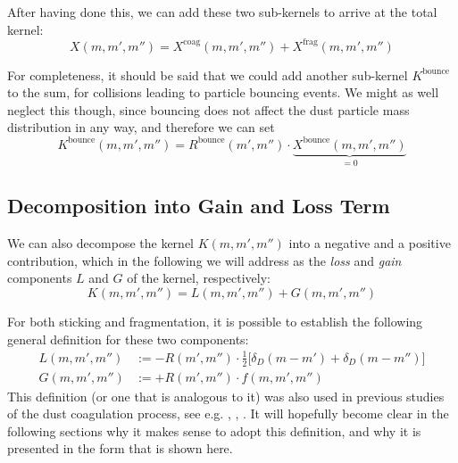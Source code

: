         After having done this, we can add these two sub-kernels to arrive at the total kernel:
        \begin{equation}
            X(m,m',m'') = X^\text{coag}(m,m',m'') + X^\text{frag}(m,m',m'')
        \end{equation}

        For completeness, it should be said that we could add another sub-kernel 
        $K^\text{bounce}$ to the sum, for collisions leading to particle bouncing events.
        We might as well neglect this though, since bouncing does not affect the dust particle mass 
        distribution in any way, and therefore we can set
        \begin{equation}
            K^\text{bounce}(m,m',m'') 
            = R^\text{bounce}(m',m'') \cdot \underbrace{X^\text{bounce}(m,m',m'')}_{=0}
        \end{equation}

    \clearpage\subsection{Decomposition into Gain and Loss Term}

        We can also decompose the kernel $K(m,m',m'')$ into a negative and a positive 
        contribution, which in the following we will address as the \textit{loss} and 
        \textit{gain} components $L$ and $G$ of the kernel, respectively:
        \begin{equation}
            K(m,m',m'') = L(m, m', m'') + G(m, m', m'') 
        \end{equation}

        For both sticking and fragmentation, it is possible to establish the following 
        general definition for these two components:
        \begin{align}
            \label{eq:definition_of_kernel_gain_and_loss}
            L(m, m', m'') 
                &:= -R(m',m'') \cdot \frac{1}{2} \bigg[\delta_D(m-m')+\delta_D(m-m'')\bigg] \\
            G(m, m', m'') 
                &:= +R(m',m'') \cdot f(m, m', m'') 
        \end{align}
        This definition (or one that is analogous to it) was also used in previous studies 
        of the dust coagulation process, see e.g. \cite{dullemond_dominik_2004},
        \cite{birnstiel_dullemond_brauer_2010}, \cite{okuzumi_2009}. 
        It will hopefully become clear in the following sections why it makes sense to adopt this 
        definition, and why it is presented in the form that is shown here.

